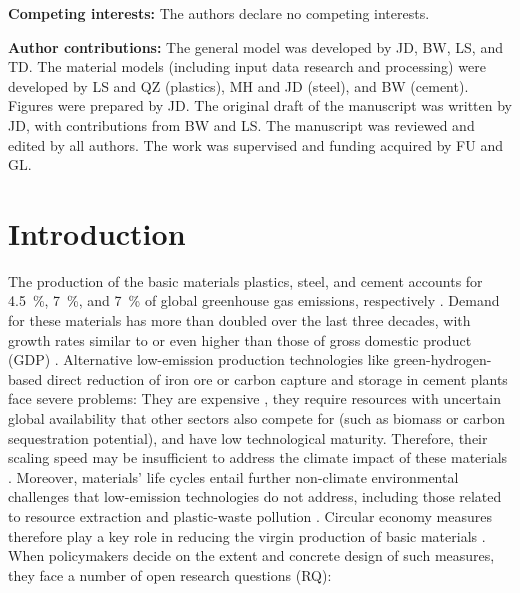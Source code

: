 \documentclass[pdflatex]{sn-jnl}
\begin{document}
\textbf{Competing interests:} The authors declare no competing interests.

\noindent\textbf{Author contributions:} The general model was developed by JD, BW, LS, and TD. The material models (including input data research and processing) were developed by LS and QZ (plastics), MH and JD (steel), and BW (cement). Figures were prepared by JD. The original draft of the manuscript was written by JD, with contributions from BW and LS. The manuscript was reviewed and edited by all authors. The work was supervised and funding acquired by FU and GL.

\clearpage

\section{Introduction}\label{sec:intro}
The production of the basic materials plastics, steel, and cement accounts for 4.5~\%, 7~\%, and 7~\% of global greenhouse gas emissions, respectively \parencite{cabernardGrowingEnvironmentalFootprint2022a,internationalenergyagencyIronSteelTechnology2020a,ieaTechnologyRoadmapLowCarbon2018}. Demand for these materials has more than doubled over the last three decades, with growth rates similar to or even higher than those of gross domestic product (GDP) \parencite{kikstraIPCCSixthAssessment2022}. Alternative low-emission production technologies like green-hydrogen-based direct reduction of iron ore or carbon capture and storage in cement plants face severe problems: They are expensive \parencite{internationalenergyagency2026,sitra2019,wu2025}, they require resources with uncertain global availability that other sectors also compete for (such as biomass \parencite{calvin2021a} or carbon sequestration \parencite{kazlou2024a} potential), and have low technological maturity. Therefore, their scaling speed may be insufficient to address the climate impact of these materials \parencite{watari2023}. Moreover, materials’ life cycles entail further non-climate environmental challenges that low-emission technologies do not address, including those related to resource extraction and plastic-waste pollution  \parencite{programme2024}. Circular economy measures therefore play a key role in reducing the virgin production of basic materials \parencite{intergovernmentalpanelonclimatechangeipccIndustry2023}. When policymakers decide on the extent and concrete design of such measures, they face a number of open research questions (RQ):
\end{document}

